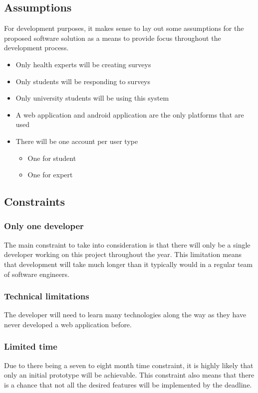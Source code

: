 \subsection{Assumptions}
For development purposes, it makes sense to lay out some assumptions for the proposed software solution as a means to provide focus throughout the development process.

\begin{itemize}
    \tightlist
    \item Only health experts will be creating surveys
    \item Only students will be responding to surveys
    \item Only university students will be using this system
    \item A web application and android application are the only platforms that are used
    \item There will be one account per user type
    \begin{itemize}
        \item One for student
        \item One for expert
    \end{itemize}
\end{itemize}


\subsection{Constraints}

\subsubsection*{Only one developer}
The main constraint to take into consideration is that there will only be a single developer working on this project throughout the year.
This limitation means that development will take much longer than it typically would in a regular team of software engineers.

\subsubsection*{Technical limitations}
The developer will need to learn many technologies along the way as they have never developed a web application before.

\subsubsection*{Limited time}
Due to there being a seven to eight month time constraint, it is highly likely that only an initial prototype will be achievable.
This constraint also means that there is a chance that not all the desired features will be implemented by the deadline. 


